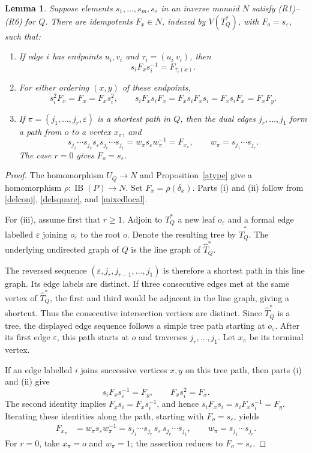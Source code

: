 \documentclass[a4paper, 12pt, reqno]{amsart}
\newtheorem{lemma}[theorem]{Lemma}
\theoremstyle{definition}
\newcommand{\eps}{\varepsilon}
\newcommand{\IB}{\operatorname{IB}}
\begin{document}
\begin{lemma}\label{transport}
Suppose elements $s_1,\ldots,s_m,s_\eps$ in an inverse monoid $N$ satisfy (R1)--(R6) for $Q$. There are idempotents $F_x\in N$, indexed by $V(T_Q^*)$, with $F_o=s_\eps$, such that:
\begin{enumerate}[label=(\roman*)]
\item If edge $i$ has endpoints $u_i,v_i$ and $\tau_i=(u_i\ v_i)$, then
\[s_iF_xs_i^{-1}=F_{\tau_i(x)}.\]
\item For either ordering $(x,y)$ of these endpoints,
\[
s_i^2F_x=F_x=F_xs_i^2,
\qquad
s_iF_xs_iF_x=F_xs_iF_xs_i=F_xs_iF_x=F_xF_y.
\]
\item If $\pi=(j_1,\ldots,j_r,\eps)$ is a shortest path in $Q$, then the dual edges $j_r,\ldots,j_1$ form a path from $o$ to a vertex $x_\pi$, and
\[
s_{j_1}\cdots s_{j_r}s_\eps s_{j_r}\cdots s_{j_1}
=w_\pi s_\eps w_\pi^{-1}=F_{x_\pi},
\qquad w_\pi=s_{j_1}\cdots s_{j_r}.
\]
The case $r=0$ gives $F_o=s_\eps$.
\end{enumerate}
\end{lemma}
\begin{proof}
The homomorphism $U_Q\to N$ and Proposition~\ref{atype} give a homomorphism $\rho:\IB(P)\to N$. Set $F_x=\rho(\delta_x)$. Parts (i) and (ii) follow from \eqref{delconj}, \eqref{delsquare}, and \eqref{mixedlocal}.

For (iii), assume first that $r\ge1$. Adjoin to $T_Q^*$ a new leaf $o_\varepsilon$ and a formal edge labelled $\varepsilon$ joining $o_\varepsilon$ to the root $o$. Denote the resulting tree by $\widehat T_Q^*$. The underlying undirected graph of $Q$ is the line graph of $\widehat T_Q^*$.

The reversed sequence $(\varepsilon,j_r,j_{r-1},\ldots,j_1)$ is therefore a shortest path in this line graph. Its edge labels are distinct. If three consecutive edges met at the same vertex of $\widehat T_Q^*$, the first and third would be adjacent in the line graph, giving a shortcut. Thus the consecutive intersection vertices are distinct.
Since $\widehat T_Q^*$ is a tree, the displayed edge sequence follows a simple tree path starting at $o_\varepsilon$. After its first edge $\varepsilon$, this path starts at $o$ and traverses $j_r,\ldots,j_1$. Let $x_\pi$ be its terminal vertex.

If an edge labelled $i$ joins successive vertices $x,y$ on this tree path, then parts (i) and (ii) give
\[
s_iF_xs_i^{-1}=F_y, \qquad  F_xs_i^2=F_x.
\]
The second identity implies $F_xs_i=F_xs_i^{-1}$, and hence $s_iF_xs_i=s_iF_xs_i^{-1}=F_y.$  Iterating these identities along the path, starting with $F_o=s_\varepsilon$, yields
\[
\begin{aligned}
F_{x_\pi} &=w_\pi s_\varepsilon w_\pi^{-1} =s_{j_1}\cdots s_{j_r}\,
s_\varepsilon\, s_{j_r}\cdots s_{j_1}, \qquad  w_\pi=s_{j_1}\cdots s_{j_r}.
\end{aligned}
\]
For $r=0$, take $x_\pi=o$ and $w_\pi=1$; the assertion reduces to $F_o=s_\varepsilon$.
\end{proof}
\end{document}

